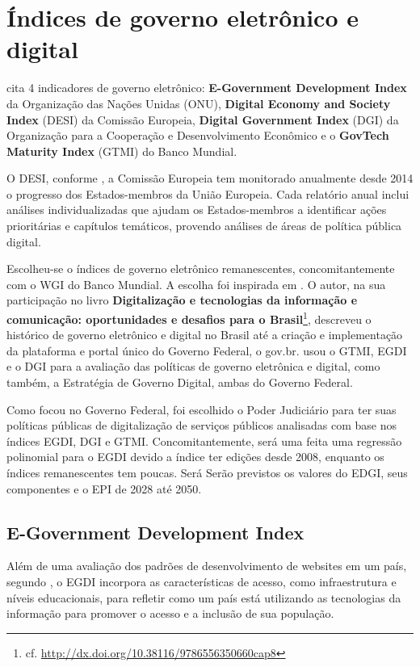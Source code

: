 \chapter{Índices de governo eletrônico e digital}

\cite{martinez2022egovernment} cita 4 indicadores de governo eletrônico: \textbf{E-Government Development Index} da Organização das Nações Unidas (ONU), \textbf{Digital Economy and Society Index} (DESI) da Comissão Europeia, \textbf{Digital Government Index} (DGI) da Organização para a Cooperação e Desenvolvimento Econômico e o \textbf{GovTech Maturity Index} (GTMI) do Banco Mundial.

O DESI, conforme \cite{desi_2022}, a Comissão Europeia tem monitorado anualmente desde 2014 o progresso dos Estados-membros da União Europeia. Cada relatório anual inclui análises individualizadas que ajudam os Estados-membros a identificar ações prioritárias e capítulos temáticos, provendo análises de áreas de política pública digital.

Escolheu-se o índices de governo eletrônico remanescentes, concomitantemente com o WGI do Banco Mundial. A escolha foi inspirada em \cite{mitkiewicz2024transformaccao}. O autor, na sua participação no livro \textbf{Digitalização e tecnologias da informação e comunicação: oportunidades e desafios para o Brasil}\footnote{cf. \url{http://dx.doi.org/10.38116/9786556350660cap8}}, descreveu o histórico de governo eletrônico e digital no Brasil até a criação e implementação da plataforma e portal único do Governo Federal, o gov.br. \cite{mitkiewicz2024transformaccao} usou o GTMI, EGDI e o DGI para a avaliação das políticas de governo eletrônica e digital, como também, a Estratégia de Governo Digital, ambas do Governo Federal.

Como \cite{mitkiewicz2024transformaccao} focou no Governo Federal, foi escolhido o Poder Judiciário para ter suas políticas públicas de digitalização de serviços públicos analisadas com base nos índices EGDI, DGI e GTMI. Concomitantemente, será uma feita uma regressão polinomial para o EGDI devido a índice ter edições desde 2008, enquanto os índices remanescentes tem poucas. Será Serão previstos os valores do EDGI, seus componentes e o EPI de 2028 até 2050.

\section{E-Government Development Index}

Além de uma avaliação dos padrões de desenvolvimento de websites em um país, segundo \cite{ONU_EGDI_description}, o EGDI incorpora as características de acesso, como infraestrutura e níveis educacionais, para refletir como um país está utilizando as tecnologias da informação para promover o acesso e a inclusão de sua população. 

